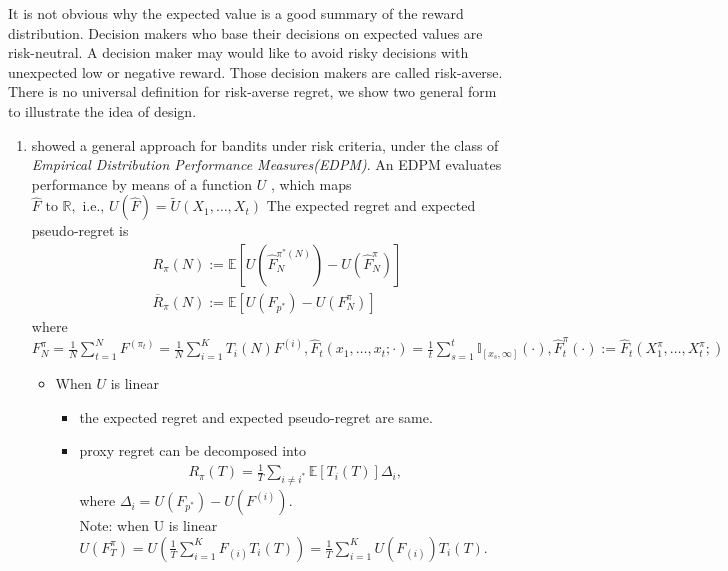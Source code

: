 \documentclass{article}
\begin{document}
It is not obvious why the expected value is a good summary of the reward distribution. Decision makers who base their decisions on expected values are risk-neutral. A decision maker may would like to avoid risky decisions with unexpected low or negative reward. Those decision makers are called risk-averse. There is no universal definition for risk-averse regret, we show two general form to illustrate the idea of design. 
    \begin{enumerate}
         \item \textcite{cassel2018general} showed a general approach for bandits under risk criteria, under the class of \textit{Empirical Distribution Performance Measures(EDPM)}. An EDPM evaluates performance by means of a function $U$ , which maps $\hat{F} \text { to } \mathbb{R}, \text { i.e., } U(\hat{F})=\tilde{U}\left(X_{1}, \ldots, X_{t}\right)$ The expected regret and expected pseudo-regret is 
        \begin{align}
            & R_{\pi}(N) :=\mathbb{E}\left[U\left(\hat{F}_{N}^{\pi^{*}(N)}\right)-U\left(\hat{F}_{N}^{\pi}\right)\right]\\
            & \overline{R}_{\pi}(N) :=\mathbb{E}\left[U\left(F_{p^{*}}\right)-U\left(F_{N}^{\pi}\right)\right]
        \end{align}
        where $F_{N}^{\pi}=\frac{1}{N} \sum_{t=1}^{N} F^{\left(\pi_{t}\right)}=\frac{1}{N} \sum_{i=1}^{K} T_{i}(N) F^{(i)},\hat{F}_{t}\left(x_{1}, \ldots, x_{t} ; \cdot\right)=\frac{1}{t} \sum_{s=1}^{t} \mathbb{I}_{\left[x_{s}, \infty\right]}(\cdot) , \hat{F}_{t}^{\pi}(\cdot) :=\hat{F}_{t}\left(X_{1}^{\pi}, \ldots, X_{t}^{\pi} ;\right)$
        \begin{itemize}
            \item When $U$ is linear
            \begin{itemize}
                \item the expected regret and expected pseudo-regret are same. 
                \item proxy regret can be decomposed into
                \begin{align}
                    R_{\pi}(T)=\frac{1}{T} \sum_{i \neq i^{*}} \mathbb{E}\left[T_{i}(T)\right] \Delta_{i},
                \end{align}
                where $\Delta_{i}=U\left(F_{p^{*}}\right)-U\left(F^{(i)}\right)$.\\
                Note: when U is linear $U(F_T^\pi) = U(\frac{1}{T} \sum_{i=1}^K F_{(i)} T_i(T)) = \frac{1}{T} \sum_{i=1}^K U(F_{(i)}) T_i(T)$.

\end{itemize}
\end{itemize}
\end{enumerate}
\end{document}
